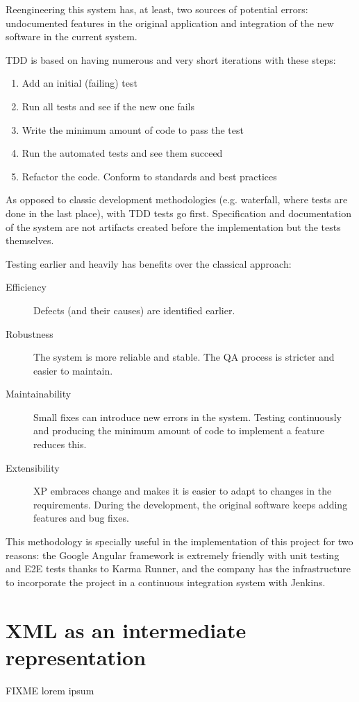 Reengineering this system has, at least, two sources of potential errors: 
undocumented features in the original application and integration of the new software in the current system.

\ac{TDD} is based on having numerous and very short iterations with these steps:
\begin{enumerate}
    \item Add an initial (failing) test
    \item Run all tests and see if the new one fails
    \item Write the minimum amount of code to pass the test
    \item Run the automated tests and see them succeed
    \item Refactor the code. Conform to standards and best practices
\end{enumerate}

As opposed to classic development methodologies (e.g. waterfall, where tests are done in the last place), with \ac{TDD} tests go first. 
Specification and documentation of the system are not artifacts created before the implementation but the tests themselves.

Testing earlier and heavily has benefits over the classical approach:
\begin{description}
\item[Efficiency] Defects (and their causes) are identified earlier.
\item[Robustness] The system is more reliable and stable. 
The \ac{QA} process is stricter and easier to maintain.
\item[Maintainability] Small fixes can introduce new errors in the system. 
Testing continuously and producing the minimum amount of code to implement a feature reduces this.
\item[Extensibility] \ac{XP} embraces change and makes it is easier to adapt to changes in the requirements. 
During the development, the original software keeps adding features and bug fixes.
\end{description}

This methodology is specially useful in the implementation of this project for two reasons: 
the Google Angular framework is extremely friendly with unit testing and \ac{E2E} tests thanks to Karma Runner, and the company has the infrastructure to incorporate the project in a continuous integration system with Jenkins.

\section{XML as an intermediate representation}
FIXME
lorem ipsum
